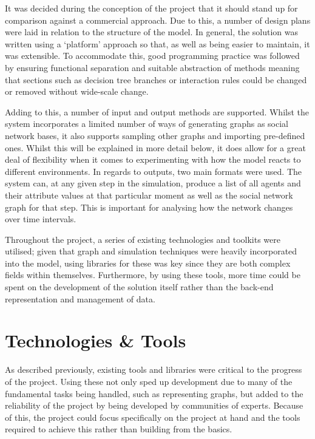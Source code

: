 \documentclass[]{report}
\begin{document}
It was decided during the conception of the project that it should stand up for comparison against a commercial approach. Due to this, a number of design plans were laid in relation to the structure of the model. In general, the solution was written using a `platform' approach so that, as well as being easier to maintain, it was extensible. To accommodate this, good programming practice was followed by ensuring functional separation and suitable abstraction of methods meaning that sections such as decision tree branches or interaction rules could be changed or removed without wide-scale change.

Adding to this, a number of input and output methods are supported. Whilst the system incorporates a limited number of ways of generating graphs as social network bases, it also supports sampling other graphs and importing pre-defined ones. Whilst this will be explained in more detail below, it does allow for a great deal of flexibility when it comes to experimenting with how the model reacts to different environments. In regards to outputs, two main formats were used. The system can, at any given step in the simulation, produce a list of all agents and their attribute values at that particular moment as well as the social network graph for that step. This is important for analysing how the network changes over time intervals.

Throughout the project, a series of existing technologies and toolkits were utilised; given that graph and simulation techniques were heavily incorporated into the model, using libraries for these was key since they are both complex fields within themselves. Furthermore, by using these tools, more time could be spent on the development of the solution itself rather than the back-end representation and management of data.

\section{Technologies \& Tools}
As described previously, existing tools and libraries were critical to the progress of the project. Using these not only sped up development due to many of the fundamental tasks being handled, such as representing graphs, but added to the reliability of the project by being developed by communities of experts. Because of this, the project could focus specifically on the project at hand and the tools required to achieve this rather than building from the basics.
\end{document}
